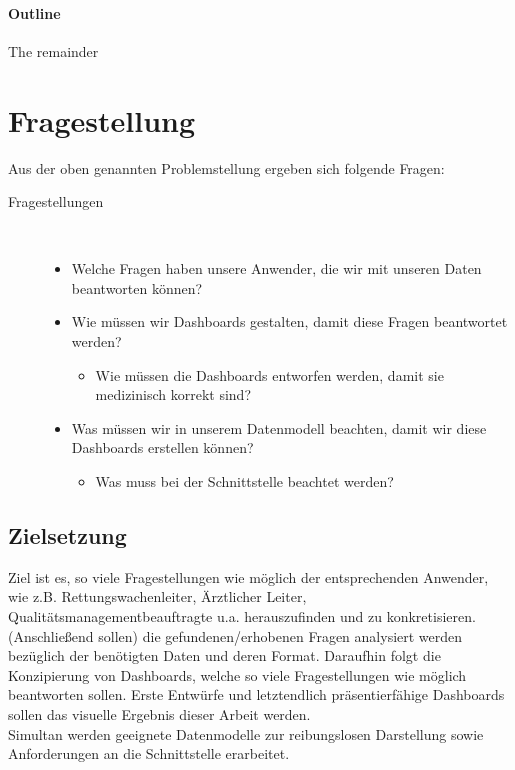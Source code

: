 \documentclass[12pt]{article}
\begin{document}
\paragraph{Outline}
The remainder

\section{Fragestellung}\label{fragestellung}
Aus der oben genannten Problemstellung ergeben sich folgende Fragen:
\begin{description}
\item[Fragestellungen]~\par
\begin{itemize}
      \item Welche Fragen haben unsere Anwender, die wir mit unseren Daten beantworten können?    
      \item Wie müssen wir Dashboards gestalten, damit diese Fragen beantwortet werden?
      \begin{itemize}
        \item Wie müssen die Dashboards entworfen werden, damit sie medizinisch korrekt sind?  
      \end{itemize}
      \item Was müssen wir in unserem Datenmodell beachten, damit wir diese Dashboards erstellen können?
      \begin{itemize}
        \item Was muss bei der Schnittstelle beachtet werden?
      \end{itemize}
\end{itemize}
\end{description}

\subsection{Zielsetzung}\label{ziel}
Ziel ist es, so viele Fragestellungen wie möglich der entsprechenden Anwender, wie z.B. Rettungswachenleiter, Ärztlicher Leiter, Qualitätsmanagementbeauftragte  u.a. herauszufinden und zu konkretisieren.
(Anschließend sollen) die gefundenen/erhobenen Fragen analysiert werden bezüglich der benötigten Daten und deren Format. Daraufhin folgt die Konzipierung von Dashboards, welche so viele Fragestellungen wie möglich beantworten sollen. Erste Entwürfe und letztendlich präsentierfähige Dashboards sollen das visuelle Ergebnis dieser Arbeit werden. \\
Simultan werden geeignete Datenmodelle zur reibungslosen Darstellung sowie Anforderungen an die Schnittstelle erarbeitet.
\end{document}
